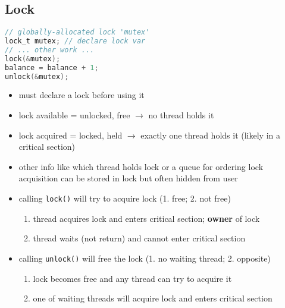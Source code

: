 \documentclass[8pt,a4paper,landscape]{extarticle}
\begin{document}
\pagestyle{empty}

\begin{multicols*}{3}
% 
% 
% 
% 

% 
% 
% 
% 
% 
% 
% 

\section*{Lock}
\begin{minipage}{.5\linewidth}
\begin{lstlisting}[language=c,xrightmargin=2pt]
// globally-allocated lock 'mutex'
lock_t mutex; // declare lock var
// ... other work ...
lock(&mutex);
balance = balance + 1;
unlock(&mutex);
\end{lstlisting}
\end{minipage}
\begin{minipage}{.5\linewidth}
  \begin{itemize}
  \item must declare a lock before using it
  \item lock available = unlocked, free $\to$ no thread holds it
  \item lock acquired = locked, held $\to$ exactly one thread holds it (likely in a critical section)
  \end{itemize}
\end{minipage}
\begin{itemize}
\item other info like which thread holds lock or a queue for ordering lock acquisition can be stored in lock but often hidden from user
\item calling \texttt{lock()} will try to acquire lock (1. free; 2. not free)
  \begin{enumerate}
  \item thread acquires lock and enters critical section; \textbf{owner} of lock
  \item thread waits (not return) and cannot enter critical section
  \end{enumerate}
\item calling \texttt{unlock()} will free the lock (1. no waiting thread; 2. opposite)
  \begin{enumerate}
  \item lock becomes free and any thread can try to acquire it
  \item one of waiting threads will acquire lock and enters critical section
  \end{enumerate}


\end{itemize}
\end{multicols*}
\end{document}
